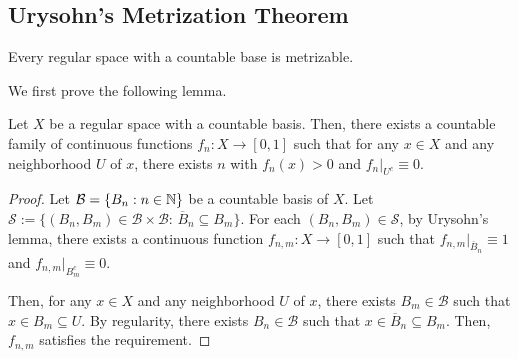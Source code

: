 





\subsection{Urysohn's Metrization Theorem}


\begin{theorem}\label{thm:urysohn-metrization}
    Every regular space with a countable base is metrizable.
\end{theorem}

We first prove the following lemma.
\begin{lemma}
    Let $X$ be a regular space with a countable basis. Then, there exists a countable family of continuous functions $f_n:X\to[0,1]$ such that for any $x\in X$ and any neighborhood $U$ of $x$, there exists $n$ with $f_n(x)>0$ and $f_n|_{U^c}\equiv 0$.
\end{lemma}
\begin{proof}
    Let $\mathcal{B}=\{B_n:n\in\mathbb{N}\}$ be a countable basis of $X$. Let $\mathcal{S}:=\{(B_n,B_m)\in \mathcal{B}\times \mathcal{B}:\,\overline{B}_n\subseteq B_m\}$. For each $(B_n,B_m)\in\mathcal{S}$, by Urysohn's lemma, there exists a continuous function $f_{n,m}:X\to[0,1]$ such that $f_{n,m}|_{\overline{B}_n}\equiv 1$ and $f_{n,m}|_{B_m^c}\equiv 0$.

    Then, for any $x\in X$ and any neighborhood $U$ of $x$, there exists $B_m\in\mathcal{B}$ such that $x\in B_m\subseteq U$. By regularity, there exists $B_n\in\mathcal{B}$ such that $x\in \overline{B}_n\subseteq B_m$. Then, $f_{n,m}$ satisfies the requirement.
\end{proof}

